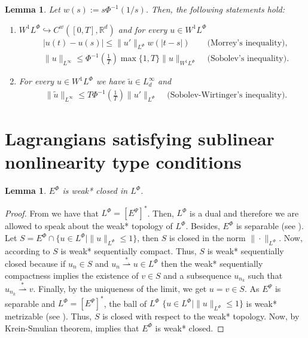 \documentclass[twoside]{article}
\newtheorem{lem}[thm]{Lemma}
\theoremstyle{remark}
\newcommand{\orlnor}{\|_{L^{\Phi}}}
\newcommand{\lphi}{L^{\Phi}}
\newcommand{\ephi}{E^{\Phi}}
\newcommand{\wphi}{W^{1}\lphi}
\newcommand{\sobnor}{\|_{W^{1}\lphi}}
\newcommand{\rr}{\mathbb{R}}
\renewcommand{\leq}{\leqslant}
\newcommand{\epsi}{E^{\Psi}}
\begin{document}
\begin{lem}\label{inclusion orlicz} Let  $w(s):= s\Phi^{-1}(1/s)$. Then, the following statements hold:
\begin{enumerate}
\item\label{inclusion orlicz_item1} $\wphi\hookrightarrow C^w([0,T],\rr^d) $ and for every $u\in\wphi$
\begin{align}
 &\left|u(t)-u(s) \right| \leq  \|u'\orlnor w(| t-s|)&\text{  (Morrey's inequality),}\label{in-sob-cont}
\\
& \|u\|_{L^{\infty}} \leq\Phi^{-1}\left(\frac{1}{T}\right)\max\{1,T\}\|u\sobnor&\text{  (Sobolev's inequality).}\label{sobolev}
\end{align}
\item For every $u\in\wphi$ we have $\widetilde{u}\in L^{\infty}_d$ and
\begin{align}
& \|\widetilde{u}\|_{L^{\infty}} \leq T\Phi^{-1}\left(\frac{1}{T}\right)\|u'\orlnor&
\text{  (Sobolev-Wirtinger's inequality).}\label{wirtinger}
\end{align}




\end{enumerate}
\end{lem}






\section{Lagrangians satisfying  sublinear nonlinearity type conditions}\label{sec:proofs}



\begin{lem}\label{lem:deb*cerrado}
$\ephi$ is weak* closed in $\lphi$.
\end{lem}


\begin{proof}
From \cite[Thm. 7, p. 110]{rao1991theory} we have that $\lphi=\left[\epsi\right]^*
$.
Then, $\lphi$ is a dual and therefore we are allowed to speak about the weak* topology of $\lphi$.
Besides, $\ephi
$ is separable (see \cite[Thm. 1, p. 87]{rao1991theory}).
Let $S=\ephi\cap \{u \in \lphi|\|u\orlnor\leq 1\}$, then $S$ is closed in the norm $\|\cdot\orlnor$. 
Now, according to \cite[Cor. 5, p. 148]{rao1991theory} $S$ is weak* sequentially compact. 
Thus, $S$ is weak* sequentially closed because if $u_n\in S$ and
$u_n \overset{*}{\rightharpoonup}u \in \lphi$ then  the weak* sequentially compactness implies the existence of $v \in S$ and a subsequence $u_{n_k}$ such that
$u_{n_k}\overset{*}{\rightharpoonup}v$. Finally, by the uniqueness of   the limit, we get
$u=v\in S$.
As $\epsi$ is separable and $\lphi=\left[\epsi\right]^*$, the ball of $\lphi$ $\{u \in \lphi | \|u\orlnor\leq 1\}$ is  weak* metrizable (see \cite[Thm. 5.1, p. 138]{Conway1977}).
Thus, $S$ is closed with respect to  the weak* topology. Now, by  Krein-Smulian theorem, \cite[Cor. 12.6, p. 165]{Conway1977} implies that $\ephi$ is weak* closed.
\end{proof}
\end{document}
